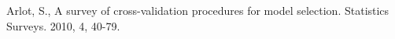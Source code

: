 \documentclass[12pt]{article}
\begin{document}
\begin{thebibliography}{999}

Arlot, S., A survey of cross-validation procedures for model selection. Statistics Surveys. 2010, 4, 40-79.



\end{thebibliography}
\end{document}
